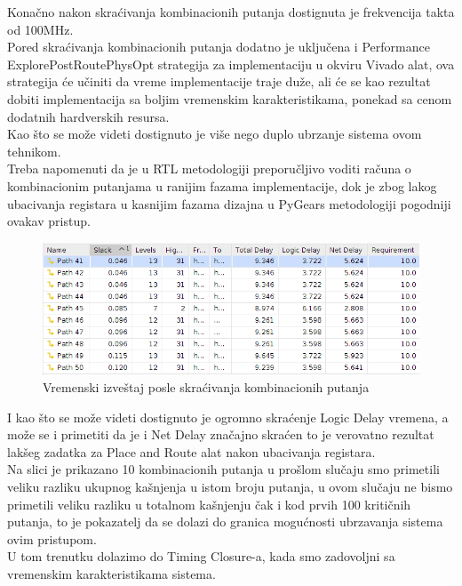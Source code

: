 \newpage

Konačno nakon skraćivanja kombinacionih putanja dostignuta je frekvencija takta
od 100MHz.\\
Pored skraćivanja kombinacionih putanja dodatno je uključena i
Performance ExplorePostRoutePhysOpt strategija za implementaciju u okviru
Vivado alat, ova strategija će učiniti da vreme implementacije traje duže, ali
će se kao rezultat dobiti implementacija sa boljim vremenskim karakteristikama,
ponekad sa cenom dodatnih hardverskih resursa. \\

Kao što se može videti dostignuto je više nego duplo ubrzanje sistema ovom tehnikom. \\
Treba napomenuti da je u RTL metodologiji preporučljivo voditi računa o
kombinacionim putanjama u ranijim fazama implementacije, dok je zbog lakog
ubacivanja registara u kasnijim fazama dizajna u PyGears metodologiji
pogodniji ovakav pristup. \\

\begin{figure}[H]
  \centering
  \includegraphics[width=1\linewidth]{results/implementation/pygears_fast/timing.png}
  \caption{Vremenski izveštaj posle skraćivanja kombinacionih putanja}
  \label{slow_time}
\end{figure}

I kao što se može videti dostignuto je ogromno skraćenje Logic Delay vremena, a
može se i primetiti da je i Net Delay značajno skraćen to je verovatno rezultat
lakšeg zadatka za Place and Route alat nakon ubacivanja registara. \\
Na slici je prikazano 10 kombinacionih putanja u prošlom slučaju smo primetili
veliku razliku ukupnog kašnjenja u istom broju putanja, u ovom slučaju ne bismo
primetili veliku razliku u totalnom kašnjenju čak i kod prvih 100 kritičnih
putanja, to je pokazatelj da se dolazi do granica mogućnosti ubrzavanja sistema
ovim pristupom. \\
U tom trenutku dolazimo do Timing Closure-a, kada smo zadovoljni sa vremenskim
karakteristikama sistema. \\
